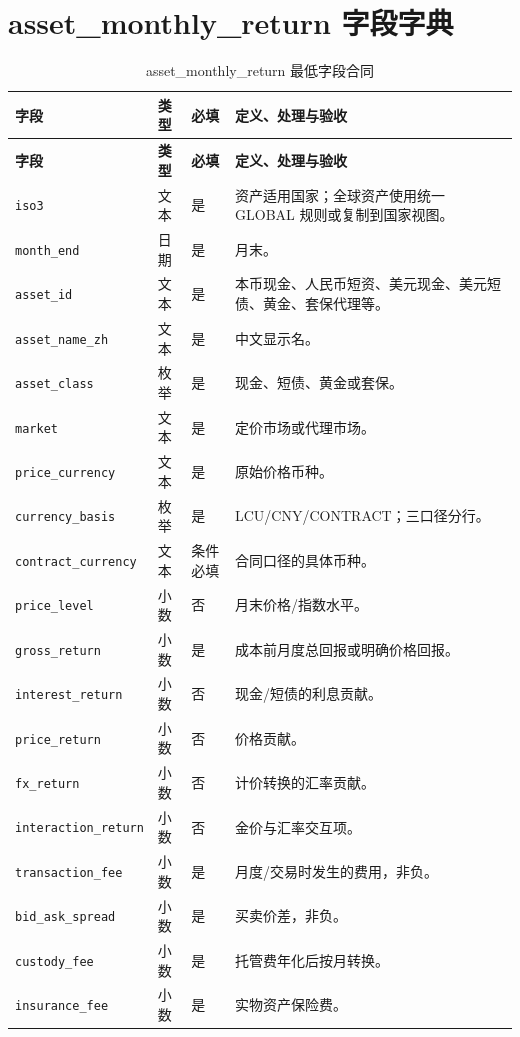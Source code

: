\documentclass[UTF8,fontset=windows,12pt,openany]{ctexbook}
\newcommand{\Field}[1]{{\small\nolinkurl{#1}}}
\begin{document}
\chapter{asset\_monthly\_return 字段字典}

\begin{longtable}{p{3.8cm}p{2.3cm}p{2.1cm}p{5.0cm}}
\caption{asset\_monthly\_return 最低字段合同}\label{tab:dict-asset}\\
\toprule
\textbf{字段} & \textbf{类型} & \textbf{必填} & \textbf{定义、处理与验收}\\
\midrule
\endfirsthead
\toprule \textbf{字段} & \textbf{类型} & \textbf{必填} & \textbf{定义、处理与验收}\\ \midrule
\endhead
\Field{iso3} & 文本 & 是 & 资产适用国家；全球资产使用统一 GLOBAL 规则或复制到国家视图。\\
\Field{month_end} & 日期 & 是 & 月末。\\
\Field{asset_id} & 文本 & 是 & 本币现金、人民币短资、美元现金、美元短债、黄金、套保代理等。\\
\Field{asset_name_zh} & 文本 & 是 & 中文显示名。\\
\Field{asset_class} & 枚举 & 是 & 现金、短债、黄金或套保。\\
\Field{market} & 文本 & 是 & 定价市场或代理市场。\\
\Field{price_currency} & 文本 & 是 & 原始价格币种。\\
\Field{currency_basis} & 枚举 & 是 & LCU/CNY/CONTRACT；三口径分行。\\
\Field{contract_currency} & 文本 & 条件必填 & 合同口径的具体币种。\\
\Field{price_level} & 小数 & 否 & 月末价格/指数水平。\\
\Field{gross_return} & 小数 & 是 & 成本前月度总回报或明确价格回报。\\
\Field{interest_return} & 小数 & 否 & 现金/短债的利息贡献。\\
\Field{price_return} & 小数 & 否 & 价格贡献。\\
\Field{fx_return} & 小数 & 否 & 计价转换的汇率贡献。\\
\Field{interaction_return} & 小数 & 否 & 金价与汇率交互项。\\
\Field{transaction_fee} & 小数 & 是 & 月度/交易时发生的费用，非负。\\
\Field{bid_ask_spread} & 小数 & 是 & 买卖价差，非负。\\
\Field{custody_fee} & 小数 & 是 & 托管费年化后按月转换。\\
\Field{insurance_fee} & 小数 & 是 & 实物资产保险费。\\

\end{longtable}
\end{document}
